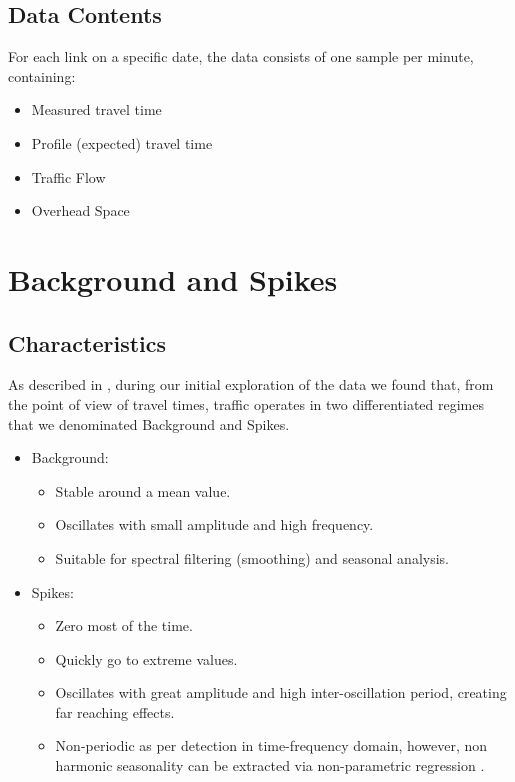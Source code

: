 \documentclass[letterpaper, 10 pt, conference]{ieeeconf}  %
\begin{document}
\subsection{Data Contents}
For each link on a specific date, the data consists of one sample per minute, containing:
\begin{itemize}
	\item Measured travel time
	\item Profile (expected) travel time 
	\item Traffic Flow
	\item Overhead Space	
\end{itemize}

\section{Background and Spikes}
\subsection{Characteristics}
As described in \cite{ttprofiles}, during our initial exploration of the data we found that, from the point of view of travel times, traffic operates in two differentiated regimes that we denominated Background and Spikes. 
\begin{itemize}
	\item Background: 
	\begin{itemize}
		\item Stable around a mean value.
		\item Oscillates with small amplitude and high frequency.
		\item Suitable for spectral filtering (smoothing) and seasonal analysis.
	\end{itemize}
	\item Spikes: 
	\begin{itemize}
		\item Zero most of the time.
		\item Quickly go to extreme values.
		\item Oscillates with great amplitude and high inter-oscillation period, creating far reaching effects.
		\item Non-periodic as per detection in time-frequency domain, however, non harmonic seasonality can be extracted via non-parametric regression .
	\end{itemize}
\end{itemize}
\end{document}
